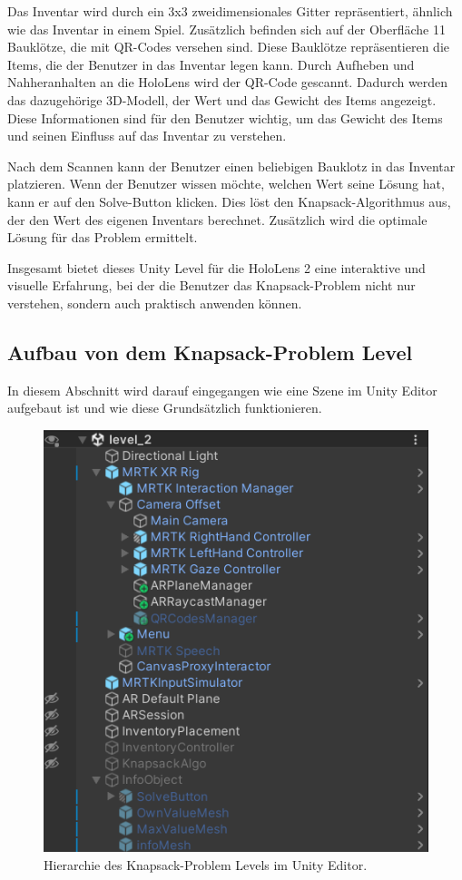 Das Inventar wird durch ein 3x3 zweidimensionales Gitter repräsentiert, ähnlich
wie das Inventar in einem Spiel. Zusätzlich befinden sich auf der Oberfläche 11 Bauklötze,
die mit QR-Codes versehen sind. Diese Bauklötze repräsentieren die Items, die der Benutzer
in das Inventar legen kann. Durch Aufheben und Nahheranhalten an die HoloLens wird der QR-Code gescannt.
Dadurch werden das dazugehörige 3D-Modell, der Wert und das Gewicht des Items angezeigt.
Diese Informationen sind für den Benutzer wichtig, um das Gewicht des Items und
seinen Einfluss auf das Inventar zu verstehen.

Nach dem Scannen kann der Benutzer einen beliebigen Bauklotz in das Inventar platzieren.
Wenn der Benutzer wissen möchte, welchen Wert seine Lösung hat, kann er auf den Solve-Button
klicken. Dies löst den Knapsack-Algorithmus aus, der den Wert des eigenen Inventars berechnet.
Zusätzlich wird die optimale Lösung für das Problem ermittelt.

Insgesamt bietet dieses Unity Level für die HoloLens 2 eine interaktive und visuelle Erfahrung,
bei der die Benutzer das Knapsack-Problem nicht nur verstehen, sondern auch praktisch anwenden können.

\subsection{Aufbau von dem Knapsack-Problem Level}
In diesem Abschnitt wird darauf eingegangen wie eine Szene im Unity Editor aufgebaut ist und wie diese
Grundsätzlich funktionieren. \\

\begin{figure}[h]
    \centering
    \includegraphics[scale=0.8]{images/Level2Hirarchy}
    \caption{Hierarchie des Knapsack-Problem Levels im Unity Editor.}
    \label{fig:level2_hierarchy}
\end{figure}

